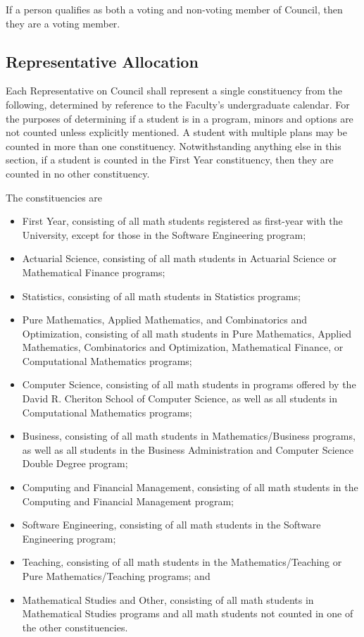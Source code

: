 If a person qualifies as both a voting and non-voting member of Council, then
they are a voting member.

\subsection{Representative Allocation}
Each Representative on Council shall represent a single constituency from the
following, determined by reference to the Faculty's undergraduate calendar. For
the purposes of determining if a student is in a program, minors and options are
not counted unless explicitly mentioned. A student with multiple plans may be
counted in more than one constituency. Notwithstanding anything else in this
section, if a student is counted in the First Year constituency, then they are
counted in no other constituency.

The constituencies are
\begin{itemize}
  \item First Year, consisting of all math students registered as first-year
    with the University, except for those in the Software Engineering program;
  \item Actuarial Science, consisting of all math students in Actuarial Science
    or Mathematical Finance programs;
  \item Statistics, consisting of all math students in Statistics programs;
  \item Pure Mathematics, Applied Mathematics, and Combinatorics and
    Optimization, consisting of all math students in Pure Mathematics, Applied
    Mathematics, Combinatorics and Optimization, Mathematical Finance, or
    Computational Mathematics programs;
  \item Computer Science, consisting of all math students in programs offered by
    the David R. Cheriton School of Computer Science, as well as all students in
    Computational Mathematics programs;
  \item Business, consisting of all math students in Mathematics/Business
    programs, as well as all students in the Business Administration and
    Computer Science Double Degree program;
  \item Computing and Financial Management, consisting of all math students in
    the Computing and Financial Management program;
  \item Software Engineering, consisting of all math students in the Software
    Engineering program;
  \item Teaching, consisting of all math students in the
    Mathematics/Teaching or Pure Mathematics/Teaching programs;
    and
  \item Mathematical Studies and Other, consisting of all math students in
    Mathematical Studies programs and all math students not counted in one of
    the other constituencies.
\end{itemize}

